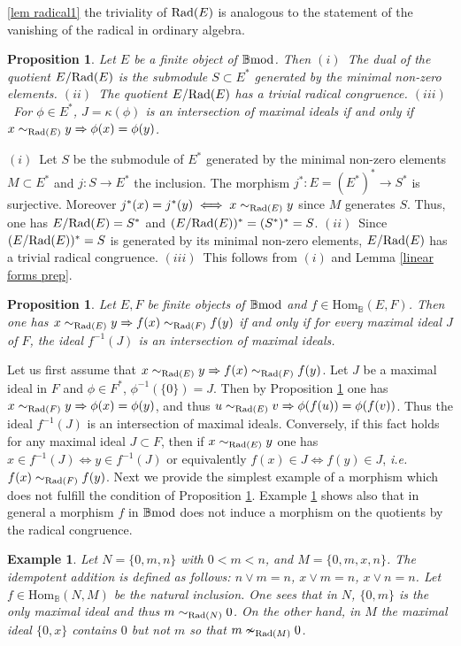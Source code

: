 \documentclass[12pt]{article}
\newtheorem{prop}[thm]{Proposition}
\newtheorem{example}[thm]{Example}
\def\Hom{{\rm Hom}}
\def\rad{{\rm Rad}}
\def\B{{\mathbb B}}
\newcommand{\ie}{{\it i.e.\/}\ }
\def\Hom {{\mbox{Hom}}}
\def\bmod{{\rm \B mod}}
\begin{document}
\ref{lem radical1} the triviality of $\rad(E)$ is analogous to the statement of the vanishing of the radical in ordinary algebra.
\begin{prop}\label{quotient by radical} Let $E$ be a finite object of $\bmod$. Then
\newline
$(i)$~The dual of the quotient $E/\rad(E)$ is the submodule $S\subset E^*$ generated by the minimal non-zero elements.\newline
$(ii)$~The quotient $E/\rad(E)$ has a trivial radical congruence.\newline
$(iii)$~For $\phi\in E^*$, $J=\kappa(\phi)$ is an intersection of maximal ideals if and only if $x\sim_{\rad(E)} y\Rightarrow \phi(x)=\phi(y)$.
\end{prop}
\proof  $(i)$~Let $S$ be the submodule of $E^*$ generated by the minimal non-zero elements $M\subset E^*$ and $j:S\to E^*$ the inclusion. The morphism $j^*:E=(E^*)^*\to S^*$ is surjective. Moreover $j^*(x)=j^*(y)\iff x\sim_{\rad(E)} y$   since $M$ generates $S$. Thus,  one has $E/\rad(E)=S^*$ and $(E/\rad(E))^*=(S^*)^*=S$. \newline
$(ii)$~Since $(E/\rad(E))^*=S$ is generated by its minimal non-zero elements,    $E/\rad(E)$ has a trivial radical congruence.\newline
$(iii)$~This follows from $(i)$ and Lemma \ref{linear forms prep}.  \endproof 

   \begin{prop}\label{good morphisms} Let $E,F$ be finite objects of $\bmod$ and $f\in \Hom_\B(E,F)$. Then one has $x\sim_{\rad(E)} y\Rightarrow f(x)\sim_{\rad(F)}f(y)$ if and only if for every maximal ideal $J$ of $F$, the ideal $f^{-1}(J)$ is an intersection of maximal ideals. 
   \end{prop}
   \proof Let us first assume that $x\sim_{\rad(E)} y\Rightarrow f(x)\sim_{\rad(F)}f(y)$. Let $J$ be a maximal ideal in $F$ and $\phi\in F^*$, $\phi^{-1}(\{0\})=J$. Then by Proposition \ref{quotient by radical} one has  $x\sim_{\rad(F)} y\Rightarrow \phi(x)=\phi(y)$, and thus $u\sim_{\rad(E)} v\Rightarrow \phi(f(u))=\phi(f(v))$. Thus the ideal $f^{-1}(J)$ is an intersection of maximal ideals. Conversely, if this fact holds for any maximal ideal $J\subset F$, then if $x\sim_{\rad(E)} y$ one has $x\in f^{-1}(J)\iff y\in f^{-1}(J)$ or equivalently $f(x)\in J\iff f(y)\in J$, \ie $f(x)\sim_{\rad(F)}f(y)$.\endproof 
   Next  we provide the simplest example of a morphism  which does not fulfill the condition of Proposition \ref{good morphisms}. Example \ref{rad not functorial} shows also that in general a morphism $f$ in $\bmod$  does not induce a morphism on the quotients by the radical congruence.
   \begin{example}\label{rad not functorial}  Let $N=\{0,m,n\}$ with $0<m<n$, and  $M=\{0,m,x,n\}$. The idempotent addition is defined as follows: $n\vee m=n$, $x\vee m=n$, $x\vee n=n$. Let $f\in \Hom_\B(N,M)$ be the natural inclusion. One sees that in $N$, $\{0,m\}$ is the only maximal ideal and thus
   $m\sim_{\rad(N)} 0$. On the other hand, in $M$ the maximal ideal $\{0,x\}$ contains $0$ but not $m$ so that $m\nsim_{\rad(M)} 0$.   	
   \end{example}
 
\end{document}
